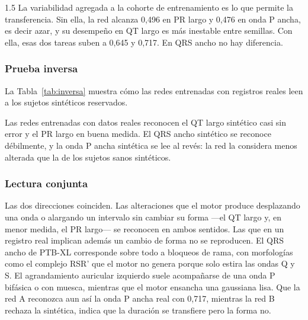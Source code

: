 \begin{spacing}{1.5}
La variabilidad agregada a la cohorte de entrenamiento es lo que permite la transferencia. Sin ella, la red alcanza 0,496 en PR largo y 0,476 en onda P ancha, es decir azar, y su desempeño en QT largo es más inestable entre semillas. Con ella, esas dos tareas suben a 0,645 y 0,717. En QRS ancho no hay diferencia.

\subsubsection{Prueba inversa}

La Tabla~\ref{tab:inversa} muestra cómo las redes entrenadas con registros reales leen a los sujetos sintéticos reservados.

\begin{table}[H]
\centering
{}
\caption{Prueba inversa: AUROC sobre los 1.500 sujetos sintéticos reservados de redes entrenadas solo con registros reales, media $\pm$ desviación estándar sobre tres semillas.}
\label{tab:inversa}
\end{table}

Las redes entrenadas con datos reales reconocen el QT largo sintético casi sin error y el PR largo en buena medida. El QRS ancho sintético se reconoce débilmente, y la onda P ancha sintética se lee al revés: la red la considera menos alterada que la de los sujetos sanos sintéticos.

\subsubsection{Lectura conjunta}

Las dos direcciones coinciden. Las alteraciones que el motor produce desplazando una onda o alargando un intervalo sin cambiar su forma ---el QT largo y, en menor medida, el PR largo--- se reconocen en ambos sentidos. Las que en un registro real implican además un cambio de forma no se reproducen. El QRS ancho de PTB-XL corresponde sobre todo a bloqueos de rama, con morfologías como el complejo RSR' que el motor no genera porque solo estira las ondas Q y S. El agrandamiento auricular izquierdo suele acompañarse de una onda P bifásica o con muesca, mientras que el motor ensancha una gaussiana lisa. Que la red A reconozca aun así la onda P ancha real con 0,717, mientras la red B rechaza la sintética, indica que la duración se transfiere pero la forma no.


\end{spacing}
